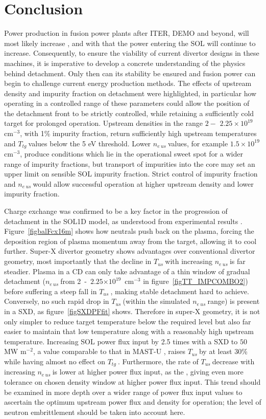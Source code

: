 \documentclass[12pt]{article}  %
\providecommand{\e}[1]{\ensuremath{\times 10^{#1}}} %
\providecommand{\noNe}[1]{{${#1}\times 10^{19}$ cm$^{-3}$}} %
\providecommand{\pow}[1]{{$^{#1}$}} %
\providecommand{\neus}{$n_{e~us}~$} %
\providecommand{\Tus}{$T_{us}~$} %
\providecommand{\Ttg}{$T_{tg}~$} %
\begin{document}
\section{Conclusion}\label{secConclusion}
Power production in fusion power plants after ITER, DEMO and beyond, will most likely increase \cite{Federici2014}, and with that the power entering the SOL will continue to increase. Consequently, to ensure the viability of current divertor designs in these machines, it is imperative to develop a concrete understanding of the physics behind detachment. Only then can its stability be ensured and fusion power can begin to challenge current energy production methods. The effects of upstream density and impurity fraction on detachment were highlighted, in particular how operating in a controlled range of these parameters could allow the position of the detachment front to be strictly controlled, while retaining a sufficiently cold target for prolonged operation. Upstream densities in the range $2 -$ \noNe{2.25}, with 1\% impurity fraction, return sufficiently high upstream temperatures and \Ttg values below the 5 eV threshold. Lower \neus values, for example \noNe{1.5}, produce conditions which lie in the operational sweet spot for a wider range of impurity fractions, but transport of impurities into the core may set an upper limit on sensible SOL impurity fraction. Strict control of impurity fraction and \neus would allow successful operation at higher upstream density and lower impurity fraction. 

Charge exchange was confirmed to be a key factor in the progression of detachment in the SOL1D model, as understood from experimental results \cite{Loarte1998, Wischmeier2009}. Figure~\ref{figbalFcx16m} shows how neutrals push back on the plasma, forcing the deposition region of plasma momentum away from the target, allowing it to cool further. Super-X divertor geometry shows advantages over conventional divertor geometry, most importantly that the decline in \Tus with increasing \neus is far steadier. Plasma in a CD can only take advantage of a thin window of gradual detachment (\neus from 2~-~$2.25\e{19}$~cm\pow{-3} in figure~\ref{figTT_IMPCOMBO2}) before suffering a steep fall in \Tus, making stable detachment hard to achieve. Conversely, no such rapid drop in \Tus (within the simulated \neus range) is present in a SXD, as figure~\ref{figSXDPFfit} shows. Therefore in super-X geometry, it is not only simpler to reduce target temperature below the required level but also far easier to maintain that low temperature along with a reasonably high upstream temperature. Increasing SOL power flux input by 2.5 times with a SXD to $50$ MW m\pow{-2}, a value comparable to that in MAST-U \cite{Havlickova2014}, raises \Tus by at least 30\% while having almost no effect on \Ttg. Furthermore, the rate of \Tus decrease with increasing \neus is lower at higher power flux input, as the , giving even more tolerance on chosen density window at higher power flux input. This trend should be examined in more depth over a wider range of power flux input values to ascertain the optimum upstream power flux and density for operation; the level of neutron embrittlement should be taken into account here.
\end{document}
